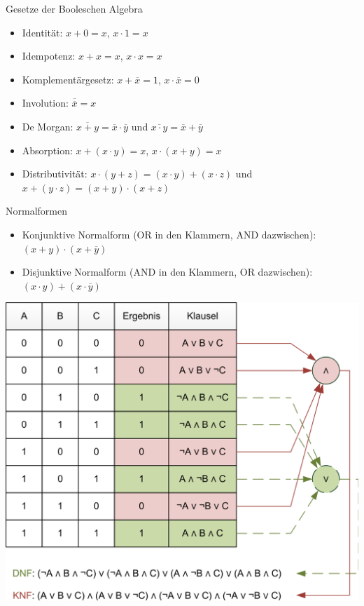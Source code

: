 \documentclass[
  german,            %
  aspectratio=169,    %
]{tumbeamer}
\begin{document}
\begin{frame}[c]{Gesetze der Booleschen Algebra}{}
  \begin{itemize}
    \item Identität: $x+0=x$, $x\cdot 1=x$
    \item Idempotenz: $x+x=x$, $x\cdot x=x$
    \item Komplementärgesetz: $x+\overline{x}=1$, $x\cdot\overline{x}=0$
    \item Involution: $\overline{\overline{x}}=x$
    \item De Morgan: $\overline{x+y}=\overline{x}\cdot\overline{y}$ und $\overline{x\cdot y}=\overline{x}+\overline{y}$
    \item Absorption: $x+(x\cdot y)=x$, $x\cdot(x+y)=x$
    \item Distributivität: $x\cdot(y+z)=(x\cdot y)+ (x\cdot z)$ und $x+(y\cdot z)=(x+y)\cdot (x+z)$
  \end{itemize}
\end{frame}

\begin{frame}[c]{Normalformen}{}
  \begin{itemize}
    \item Konjunktive Normalform (OR in den Klammern, AND dazwischen): $(x+y) \cdot (x+\overline{y})$
    \item Disjunktive Normalform (AND in den Klammern, OR dazwischen): $(x\cdot y) + (x\cdot\overline{y})$
  \end{itemize}
  \centering
  \includegraphics[height=0.70\textheight]{resources/w05_knf_dnf}
\end{frame}
\end{document}
